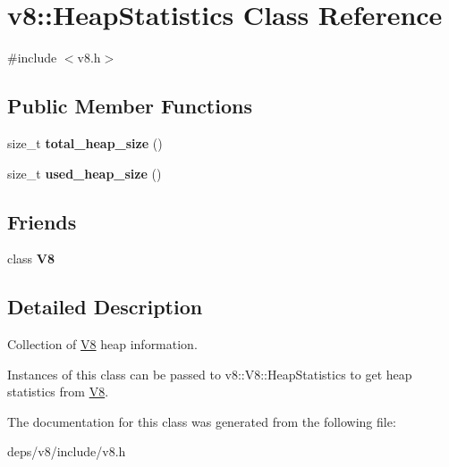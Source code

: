 \hypertarget{classv8_1_1_heap_statistics}{}\section{v8\+:\+:Heap\+Statistics Class Reference}
\label{classv8_1_1_heap_statistics}


{\ttfamily \#include $<$v8.\+h$>$}

\subsection*{Public Member Functions}
\begin{DoxyCompactItemize}
\item 
\hypertarget{classv8_1_1_heap_statistics_ac005b9c55d5818b6969c8fd61359139b}{}size\+\_\+t {\bfseries total\+\_\+heap\+\_\+size} ()\label{classv8_1_1_heap_statistics_ac005b9c55d5818b6969c8fd61359139b}

\item 
\hypertarget{classv8_1_1_heap_statistics_a05ecb48bceea49d2fe430c81df02babc}{}size\+\_\+t {\bfseries used\+\_\+heap\+\_\+size} ()\label{classv8_1_1_heap_statistics_a05ecb48bceea49d2fe430c81df02babc}

\end{DoxyCompactItemize}
\subsection*{Friends}
\begin{DoxyCompactItemize}
\item 
\hypertarget{classv8_1_1_heap_statistics_a51a1fbf409294cf02a99a020ac94a763}{}class {\bfseries V8}\label{classv8_1_1_heap_statistics_a51a1fbf409294cf02a99a020ac94a763}

\end{DoxyCompactItemize}


\subsection{Detailed Description}
Collection of \hyperlink{classv8_1_1_v8}{V8} heap information.

Instances of this class can be passed to v8\+::\+V8\+::\+Heap\+Statistics to get heap statistics from \hyperlink{classv8_1_1_v8}{V8}. 

The documentation for this class was generated from the following file\+:\begin{DoxyCompactItemize}
\item 
deps/v8/include/v8.\+h\end{DoxyCompactItemize}
